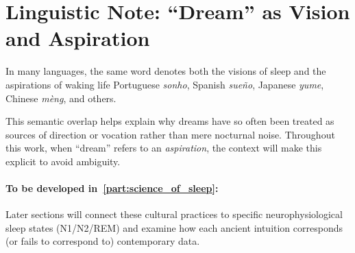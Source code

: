\section{Linguistic Note: “Dream” as Vision and Aspiration}\label{sec:linguistic_note}

In many languages, the same word denotes both the visions of sleep and the aspirations of waking life \- Portuguese \textit{sonho}, Spanish \textit{sueño}, Japanese \textit{yume}, Chinese \textit{mèng}, and others.  

This semantic overlap helps explain why dreams have so often been treated as sources of direction or vocation rather than mere nocturnal noise.  
Throughout this work, when “dream” refers to an \emph{aspiration}, the context will make this explicit to avoid ambiguity.

\paragraph{To be developed in~\ref{part:science_of_sleep}:}
Later sections will connect these cultural practices to specific neurophysiological sleep states (N1/N2/REM) and examine how each ancient intuition corresponds (or fails to correspond to) contemporary data.